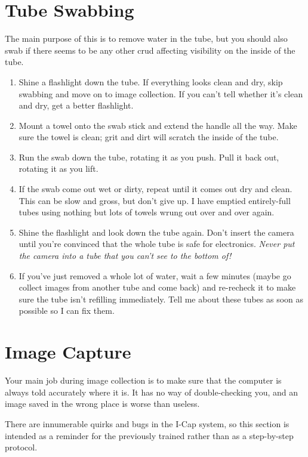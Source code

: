 \documentclass[11pt]{article}
\begin{document}
\section{Tube Swabbing}
	The main purpose of this is to remove water in the tube, but you should also  swab if there seems to be any other crud affecting visibility on the inside of the tube.
	\begin{enumerate}
		\item{Shine a flashlight down the tube. If everything looks clean and dry, skip swabbing and move on to image collection. If you can't tell whether it's clean and dry, get a better flashlight.}
		\item{Mount a towel onto the swab stick and extend the handle all the way. Make sure the towel is clean; grit and dirt will scratch the inside of the tube.}
		\item{Run the swab down the tube, rotating it as you push. Pull it back out, rotating it as you lift.}
		\item{If the swab come out  wet or dirty, repeat until it comes out dry and clean. This can be slow and gross, but don't give up. I have emptied entirely-full tubes using nothing but lots of towels wrung out over and over again.}
		\item{Shine the flashlight and look down the tube again. Don't insert the camera until you're convinced that the whole tube is safe for electronics. \textit{Never put the camera into a tube that you can't see to the bottom of!}}
		\item{If you've just removed a whole lot of water, wait a few minutes (maybe go collect images from another tube and come back) and re-recheck it to make sure the tube isn't refilling immediately. Tell me about these tubes as soon as possible so I can fix them.}
\end{enumerate}
	
\section{Image Capture}
	Your main job during image collection is to make sure that the computer is always told accurately where it is. It has no way of double-checking you, and an image saved in the wrong place is worse than useless.
	
	There are innumerable quirks and bugs in the I-Cap system, so this section is intended as a reminder for the previously trained rather than as a step-by-step protocol.
	
\end{document}
